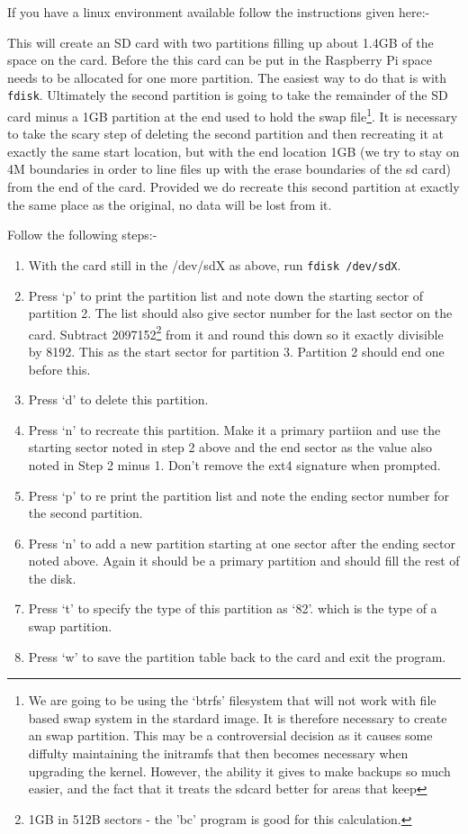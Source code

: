 \documentclass[Draft]{akc}
\begin{document}
If you have a linux environment available follow the instructions given here:- 

This will create an SD card with two partitions filling up about 1.4GB of the space on the card.
Before the this card can be put in the Raspberry Pi space needs to be allocated for one more
partition.  The easiest way to do that is with  \texttt{fdisk}.  Ultimately the second partition is
going to take the remainder of the SD card minus a 1GB partition at the end used to hold the swap
file\footnote{We are going to be using the `btrfs' filesystem that will not work with file based swap system in the 
stardard image. It is therefore necessary to create an swap partition. This may be a controversial decision as it causes
some diffulty maintaining the initramfs that then becomes necessary when upgrading the kernel.  However, the ability it gives to
make backups so much easier, and the fact that it treats the sdcard better for areas that keep }.  It is necessary to
take the scary step of deleting the second partition and then recreating it at exactly the same
start location, but with the end location 1GB (we try to stay on 4M boundaries in order to line files up
with the erase boundaries of the sd card) from the end of the card. Provided we do recreate this
second partition at exactly the same place as the original, no data will be lost from it.

Follow the following steps:-
\begin{enumerate}
\item With the card still in the /dev/sdX as above, run \texttt{fdisk /dev/sdX}.
\item Press `p' to print the partition list and note down the starting sector of partition 2.  The
list should also give sector number for the last sector on the card. Subtract 2097152\footnote{1GB
in 512B sectors - the 'bc' program is good for this calculation.} from it and round this down so it exactly 
divisible by 8192. This as the start sector
for partition 3. Partition 2 should end one before this.
\item Press `d' to delete this partition.
\item Press `n' to recreate this partition.  Make it a primary partiion and use the starting sector
noted in step 2 above and the end sector as the value also noted in Step 2 minus 1. Don't remove the
ext4 signature when prompted.
\item Press `p' to re print the partition list and note the ending sector number for the second partition.
\item Press `n' to add a new partition starting at one sector after the ending sector noted above.
Again it should be a primary partition and should fill the rest of the disk.
\item Press `t' to specify the type of this partition as `82'. which is the type of a swap partition.
\item Press `w' to save the partition table back to the card and exit the program.
\end{enumerate}
\end{document}
